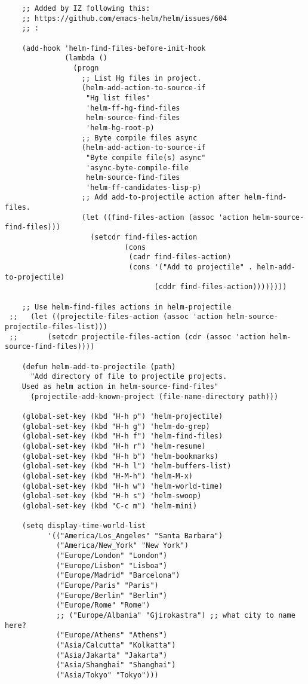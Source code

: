 \documentclass[nofonts]{tufte-handout}
\begin{document}
\begin{enumerate}
\begin{verbatim}
    ;; Added by IZ following this:
    ;; https://github.com/emacs-helm/helm/issues/604
    ;; :

    (add-hook 'helm-find-files-before-init-hook
              (lambda ()
                (progn
                  ;; List Hg files in project.
                  (helm-add-action-to-source-if
                   "Hg list files"
                   'helm-ff-hg-find-files
                   helm-source-find-files
                   'helm-hg-root-p)
                  ;; Byte compile files async
                  (helm-add-action-to-source-if
                   "Byte compile file(s) async"
                   'async-byte-compile-file
                   helm-source-find-files
                   'helm-ff-candidates-lisp-p)
                  ;; Add add-to-projectile action after helm-find-files.
                  (let ((find-files-action (assoc 'action helm-source-find-files)))
                    (setcdr find-files-action
                            (cons
                             (cadr find-files-action)
                             (cons '("Add to projectile" . helm-add-to-projectile)
                                   (cddr find-files-action))))))))

    ;; Use helm-find-files actions in helm-projectile
 ;;   (let ((projectile-files-action (assoc 'action helm-source-projectile-files-list)))
 ;;       (setcdr projectile-files-action (cdr (assoc 'action helm-source-find-files))))

    (defun helm-add-to-projectile (path)
      "Add directory of file to projectile projects.
    Used as helm action in helm-source-find-files"
      (projectile-add-known-project (file-name-directory path)))

    (global-set-key (kbd "H-h p") 'helm-projectile)
    (global-set-key (kbd "H-h g") 'helm-do-grep)
    (global-set-key (kbd "H-h f") 'helm-find-files)
    (global-set-key (kbd "H-h r") 'helm-resume)
    (global-set-key (kbd "H-h b") 'helm-bookmarks)
    (global-set-key (kbd "H-h l") 'helm-buffers-list)
    (global-set-key (kbd "H-M-h") 'helm-M-x)
    (global-set-key (kbd "H-h w") 'helm-world-time)
    (global-set-key (kbd "H-h s") 'helm-swoop)
    (global-set-key (kbd "C-c m") 'helm-mini)

    (setq display-time-world-list
          '(("America/Los_Angeles" "Santa Barbara")
            ("America/New_York" "New York")
            ("Europe/London" "London")
            ("Europe/Lisbon" "Lisboa")
            ("Europe/Madrid" "Barcelona")
            ("Europe/Paris" "Paris")
            ("Europe/Berlin" "Berlin")
            ("Europe/Rome" "Rome")
            ;; ("Europe/Albania" "Gjirokastra") ;; what city to name here?
            ("Europe/Athens" "Athens")
            ("Asia/Calcutta" "Kolkatta")
            ("Asia/Jakarta" "Jakarta")
            ("Asia/Shanghai" "Shanghai")
            ("Asia/Tokyo" "Tokyo")))
\end{verbatim}
\end{enumerate}
\end{document}
